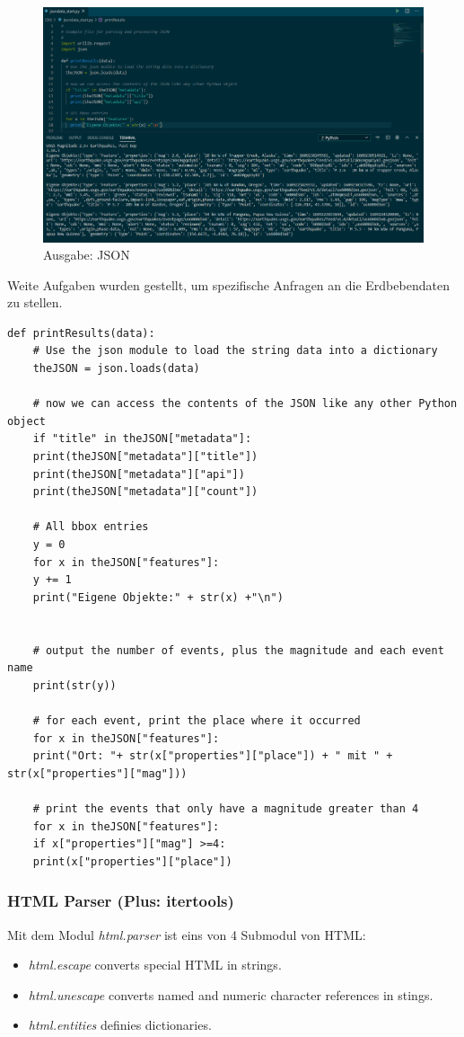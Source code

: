 \begin{figure}[H]
	\centering
	\includegraphics[scale = 0.3]{attachment/chapter_3/Scc075}
	\caption{Ausgabe: JSON}
\end{figure}  

Weite Aufgaben wurden gestellt, um spezifische Anfragen an die Erdbebendaten zu stellen.
\begin{lstlisting}[style=python]
	def printResults(data):
	# Use the json module to load the string data into a dictionary
	theJSON = json.loads(data)
	
	# now we can access the contents of the JSON like any other Python object
	if "title" in theJSON["metadata"]:
	print(theJSON["metadata"]["title"])
	print(theJSON["metadata"]["api"])
	print(theJSON["metadata"]["count"])
	
	# All bbox entries
	y = 0
	for x in theJSON["features"]:
	y += 1
	print("Eigene Objekte:" + str(x) +"\n")
	
	
	# output the number of events, plus the magnitude and each event name  
	print(str(y))
	
	# for each event, print the place where it occurred
	for x in theJSON["features"]:
	print("Ort: "+ str(x["properties"]["place"]) + " mit " + str(x["properties"]["mag"]))
	
	# print the events that only have a magnitude greater than 4
	for x in theJSON["features"]:
	if x["properties"]["mag"] >=4:
	print(x["properties"]["place"])
\end{lstlisting}

\subsubsection{HTML Parser (Plus: itertools)}
Mit dem Modul \textit{html.parser} ist eins von 4 Submodul von \gls{HTML}:
\begin{itemize}
	\item \textit{html.escape} converts special \gls{HTML} in strings.
	\item \textit{html.unescape} converts named and numeric character references in stings.
	\item \textit{html.entities} definies dictionaries.
\end{itemize} 

